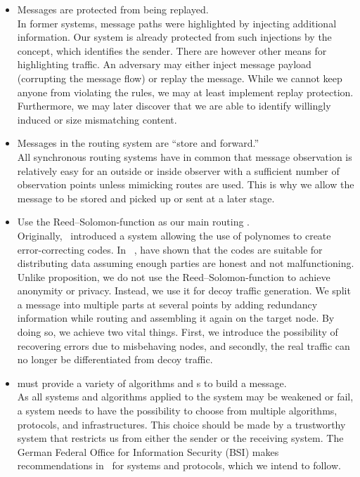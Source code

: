 \begin{itemize}
	\item Messages are protected from being replayed.\\
	In former systems, message paths were highlighted by injecting additional information. Our system is already protected from such injections by the  concept, which identifies the sender. There are however other means for highlighting traffic. An adversary may either inject message payload (corrupting the message flow) or replay the message. While we cannot keep anyone from violating the rules, we may at least implement replay protection. Furthermore, we may later discover that we are able to identify willingly induced or size mismatching content.
	\item Messages in the routing system are ``store and forward.''\\
	All synchronous routing systems have in common that message observation is relatively easy for an outside or inside observer with a sufficient number of observation points unless mimicking routes are used. This is why we allow the message to be stored and picked up or sent at a later stage. 
	\item Use the Reed--Solomon-function as our main routing .\\
	Originally,~\cite{reed1960polynomial} introduced a system allowing the use of polynomes to create error-correcting codes. In~\cite{chaum1988multiparty} \citeauthor{chaum1988multiparty}, have shown that the codes are suitable for distributing data assuming enough parties are honest and not malfunctioning. Unlike \citeauthor{chaum1988multiparty} proposition, we do not use the Reed--Solomon-function to achieve anonymity or privacy. Instead, we use it for decoy traffic generation. We split a message into multiple parts at several points by adding redundancy information while routing and assembling it again on the target node. By doing so, we achieve two vital things. First, we introduce the possibility of recovering errors due to misbehaving nodes, and secondly, the real traffic can no longer be differentiated from decoy traffic. 
	\item \MessageVortex{} must provide a variety of algorithms and s to build a message.\\        
	As all systems and algorithms applied to the system may be weakened or fail, a system needs to have the possibility to choose from multiple algorithms, protocols, and infrastructures. This choice should be made by a trustworthy system that restricts us from either the sender or the receiving system. The German Federal Office for Information Security (BSI) makes recommendations in~\cite{bsiPostQuantum} for systems and protocols, which we intend to follow.
	

\end{itemize}
